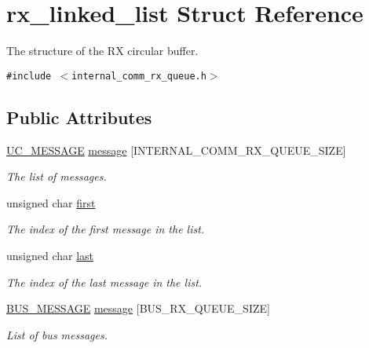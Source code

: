 \hypertarget{structrx__linked__list}{
\section{rx\_\-linked\_\-list Struct Reference}
\label{structrx__linked__list}
}
The structure of the RX circular buffer.  


{\tt \#include $<$internal\_\-comm\_\-rx\_\-queue.h$>$}

\subsection*{Public Attributes}
\begin{CompactItemize}
\item 
\hypertarget{structrx__linked__list_690a32d82d946d4817406a4a69a3a4bb}{
\hyperlink{structUC__MESSAGE}{UC\_\-MESSAGE} \hyperlink{structrx__linked__list_690a32d82d946d4817406a4a69a3a4bb}{message} \mbox{[}INTERNAL\_\-COMM\_\-RX\_\-QUEUE\_\-SIZE\mbox{]}}
\label{structrx__linked__list_690a32d82d946d4817406a4a69a3a4bb}

\begin{CompactList}\small\item\em The list of messages. \item\end{CompactList}\item 
unsigned char \hyperlink{structrx__linked__list_5a6fd79367e1878f5c648fec5927b017}{first}
\begin{CompactList}\small\item\em The index of the first message in the list. \item\end{CompactList}\item 
unsigned char \hyperlink{structrx__linked__list_55919c4eeb81169077b203ae1dcb33be}{last}
\begin{CompactList}\small\item\em The index of the last message in the list. \item\end{CompactList}\item 
\hypertarget{structrx__linked__list_de3fed919e1c01b0f4c83722cc9ca1a8}{
\hyperlink{structBUS__MESSAGE}{BUS\_\-MESSAGE} \hyperlink{structrx__linked__list_de3fed919e1c01b0f4c83722cc9ca1a8}{message} \mbox{[}BUS\_\-RX\_\-QUEUE\_\-SIZE\mbox{]}}
\label{structrx__linked__list_de3fed919e1c01b0f4c83722cc9ca1a8}

\begin{CompactList}\small\item\em List of bus messages. \item\end{CompactList}\end{CompactItemize}


